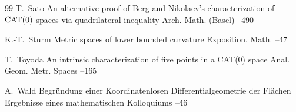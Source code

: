 \begin{thebibliography}{99}
\by T.~Sato
\paper An alternative proof of {B}erg and {N}ikolaev's characterization of {$\rm CAT(0)$}-spaces via quadrilateral inequality
\jour Arch. Math. (Basel)
--490

\by K.-T.~Sturm
\paper Metric spaces of lower bounded curvature
\jour Exposition. Math.
--47

\by T.~Toyoda
\paper An intrinsic characterization of five points in a {CAT}(0) space
\jour Anal. Geom. Metr. Spaces
--165

\by A.~Wald
\paper Begr\"undung einer Koordinatenlosen Differentialgeometrie der Fl\"achen
\jour Ergebnisse eines mathematischen Kolloquiums
--46

\end{thebibliography}
